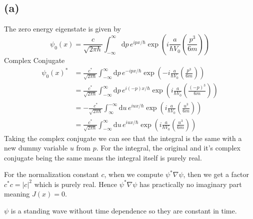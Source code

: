 \documentclass[letter, 10pts]{article}
\newcommand{\hb}{\hbar}
\begin{document}
\subsection*{(a)} 
The zero energy eigenstate is given by 
\[
\psi_0(x) =
\frac{c}{\sqrt{2 \pi \hb} }
\int_{-\infty}^{\infty} 
\mathrm{d} p\, 
e^{ipx / \hb}
\exp 
\left(
i \frac{a}{\hb V_0} \left(\frac{p^3}{6m}\right)
\right)
\] 
Complex Conjugate
\begin{align*}
	\psi_0(x)^{*} &=
\frac{c^{*}}{\sqrt{2 \pi \hb} }
\int_{-\infty}^{\infty} 
\mathrm{d} p\, 
e^{-ipx / \hb}
\exp 
\left(
- i \frac{a}{\hb V_0} \left(\frac{p^3}{6m}\right)
\right) 
\\
	&=
\frac{c^{*}}{\sqrt{2 \pi \hb} }
\int_{-\infty}^{\infty} 
\mathrm{d} p\, 
e^{i(-p)x / \hb}
\exp 
\left(
 i \frac{a}{\hb V_0} \left(\frac{(-p)^3}{6m}\right)
\right) \\
	&= - 
\frac{c^{*}}{\sqrt{2 \pi \hb} }
\int_{\infty}^{-\infty} 
\mathrm{d} u\, 
e^{i u x / \hb}
\exp 
\left(
 i \frac{a}{\hb V_0} \left(\frac{u^3}{6m}\right)
\right) \tag{$ - p : = u$}
\\ 	&= 
\frac{c^{*}}{\sqrt{2 \pi \hb} }
\int_{-\infty}^{\infty} 
\mathrm{d} u\, 
e^{i u x / \hb}
\exp 
\left(
 i \frac{a}{\hb V_0} \left(\frac{u^3}{6m}\right)
\right) 
\end{align*} 
Taking the complex conjugate we can see that the integral is the same with a new dummy variable $u$ from $p$. For the integral, the original and it's complex conjugate being the same means the integral itself is purely real. 

For the normalization constant $c$, when we compute $\psi^{*} \nabla \psi$, then we get a factor $c^{*} c = |c|^2$ which is purely real. Hence $\psi ^{*} \nabla \psi$ has practically no imaginary part meaning $J(x) = 0$. 

$\psi$ is a standing wave without time dependence so they are constant in time.
\end{document}
